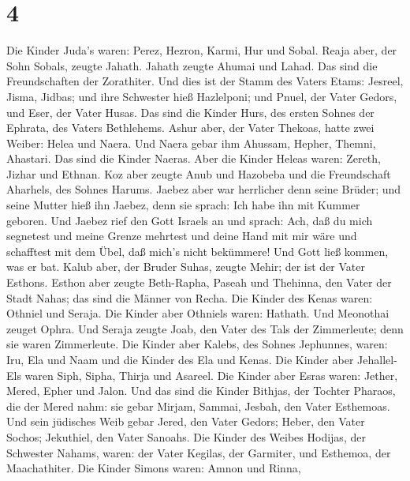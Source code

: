 \hypertarget{section-3}{%
\section{4}\label{section-3}}

 Die Kinder Juda's waren: Perez, Hezron, Karmi, Hur und
Sobal.  Reaja aber, der Sohn Sobals, zeugte Jahath. Jahath
zeugte Ahumai und Lahad. Das sind die Freundschaften der Zorathiter.
 Und dies ist der Stamm des Vaters Etams: Jesreel, Jisma,
Jidbas; und ihre Schwester hieß Hazlelponi;  und Pnuel, der
Vater Gedors, und Eser, der Vater Husas. Das sind die Kinder Hurs, des
ersten Sohnes der Ephrata, des Vaters Bethlehems.  Ashur
aber, der Vater Thekoas, hatte zwei Weiber: Helea und Naera.
 Und Naera gebar ihm Ahussam, Hepher, Themni, Ahastari. Das
sind die Kinder Naeras.  Aber die Kinder Heleas waren:
Zereth, Jizhar und Ethnan.  Koz aber zeugte Anub und
Hazobeba und die Freundschaft Aharhels, des Sohnes Harums. 
Jaebez aber war herrlicher denn seine Brüder; und seine Mutter hieß ihn
Jaebez, denn sie sprach: Ich habe ihn mit Kummer geboren. 
Und Jaebez rief den Gott Israels an und sprach: Ach, daß du mich
segnetest und meine Grenze mehrtest und deine Hand mit mir wäre und
schafftest mit dem Übel, daß mich's nicht bekümmere! Und Gott ließ
kommen, was er bat.  Kalub aber, der Bruder Suhas, zeugte
Mehir; der ist der Vater Esthons.  Esthon aber zeugte
Beth-Rapha, Paseah und Thehinna, den Vater der Stadt Nahas; das sind die
Männer von Recha.  Die Kinder des Kenas waren: Othniel und
Seraja. Die Kinder aber Othniels waren: Hathath.  Und
Meonothai zeuget Ophra. Und Seraja zeugte Joab, den Vater des Tals der
Zimmerleute; denn sie waren Zimmerleute.  Die Kinder aber
Kalebs, des Sohnes Jephunnes, waren: Iru, Ela und Naam und die Kinder
des Ela und Kenas.  Die Kinder aber Jehallel-Els waren
Siph, Sipha, Thirja und Asareel.  Die Kinder aber Esras
waren: Jether, Mered, Epher und Jalon. Und das sind die Kinder Bithjas,
der Tochter Pharaos, die der Mered nahm: sie gebar Mirjam, Sammai,
Jesbah, den Vater Esthemoas.  Und sein jüdisches Weib gebar
Jered, den Vater Gedors; Heber, den Vater Sochos; Jekuthiel, den Vater
Sanoahs.  Die Kinder des Weibes Hodijas, der Schwester
Nahams, waren: der Vater Kegilas, der Garmiter, und Esthemoa, der
Maachathiter.  Die Kinder Simons waren: Amnon und Rinna,
